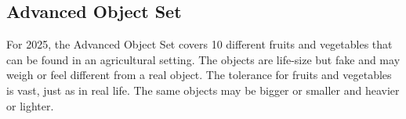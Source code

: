 %
%
%



\clearpage
\subsection{Advanced Object Set}


For 2025, the Advanced Object Set covers 10 different fruits and vegetables that can be found in an agricultural setting. The objects are life-size but fake and may weigh or feel different from a real object. The tolerance for fruits and vegetables is vast, just as in real life. The same objects may be bigger or smaller and heavier or lighter. 


